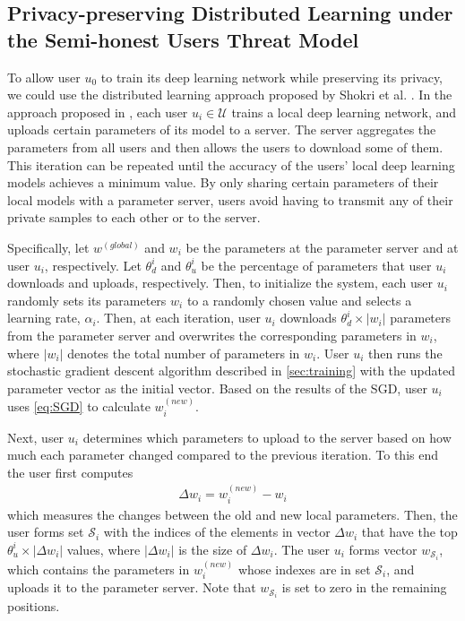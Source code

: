 \documentclass[conference]{IEEEtran}
\begin{document}
\subsection{Privacy-preserving Distributed Learning under the Semi-honest Users Threat Model}
To allow user $u_0$ to train its deep learning network while preserving its privacy, we could use the distributed
learning approach proposed by Shokri et al. \cite{shokri2015privacy}. 
In the approach proposed in \cite{shokri2015privacy}, each user $u_i\in\mathcal{U}$ trains a local deep learning
network, and uploads certain parameters of its model to a server. The server aggregates the parameters from all users and
then allows the users to download some of them. This iteration can be repeated until the accuracy of the users' local deep learning models
achieves a minimum value.
By only sharing certain parameters of their local models
with a parameter server, users avoid having to transmit any of their private samples to each other or to the server.  


Specifically, let  $w^{(global)}$ and $w_i$ be the parameters at the parameter server and at user $u_i$, respectively. Let 
$\theta_d^{i}$ and $\theta_u^{i}$ be the percentage of parameters that user $u_i$ downloads and uploads, respectively. Then, 
to initialize the system,  each user $u_i$ randomly sets its parameters $w_i$ to a randomly chosen value and selects a learning rate,
$\alpha_i$. Then, at each iteration,  user $u_i$  downloads $\theta_d^{i} \times |w_i|$ parameters from the parameter server and
overwrites the corresponding parameters in $w_i$, where $|w_i|$ denotes the total number of parameters in $w_i$. User $u_i$ then runs
the stochastic gradient descent algorithm described in \ref{sec:training} with the updated parameter vector as the initial vector. 
Based on the results of the SGD,  user $u_i$ uses \eqref{eq:SGD} to calculate $w_i^{(new)}$.

Next, user $u_i$ determines which parameters to upload to the server based on how much each parameter changed compared to the previous iteration.  To
this end the user first computes
\begin{align}\label{eq:deltaParam}
\Delta w_i =  w_i^{(new)} -  w_i
\end{align}
which measures the changes between the old and new
local parameters. Then, the user forms set $\mathcal{S}_i$ with the indices of the elements in vector $\Delta w_i$ that have the top 
$\theta_u^{i} \times |\Delta w_i|$ values, where $|\Delta w_i|$ is the size of $\Delta w_i$. 
The user $u_i$ forms vector $w_{\mathcal{S}_i}$, which contains the parameters in $w_i^{(new)}$ whose indexes are in
set $\mathcal{S}_i$, and uploads it to the parameter server. Note that $w_{\mathcal{S}_i}$  is set to zero in the remaining
positions. 
\end{document}
